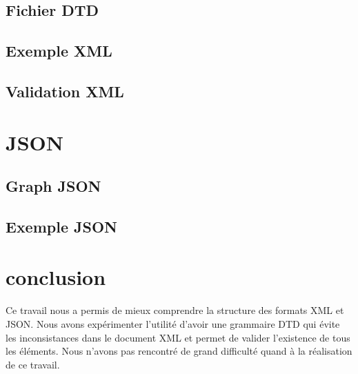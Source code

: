 \documentclass[a4paper]{article}
\begin{document}
\vspace{170px}

\subsection{Fichier DTD}

\subsection{Exemple XML}

\subsection{Validation XML}


\section{JSON}
\subsection{Graph JSON}
\subsection{Exemple JSON}


\section{conclusion}
Ce travail nous a permis de mieux comprendre la structure des formats XML et JSON. Nous avons expérimenter l'utilité d'avoir une grammaire DTD qui évite les inconsistances dans le document XML et permet de valider l'existence de tous les éléments. Nous n'avons pas rencontré de grand difficulté quand à la réalisation de ce travail.
\end{document}
